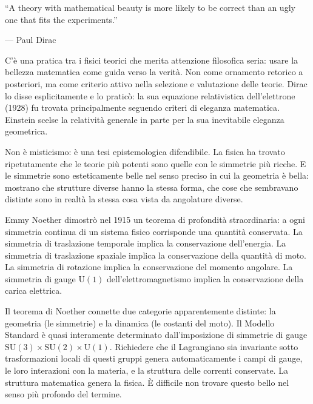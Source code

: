 \documentclass[12pt,a4paper,openany]{book}
\newcommand{\sezione}[1]{\vspace{1.2em}{\large\bfseries #1}\vspace{0.5em}\par}
\begin{document}
\epigraph{``A theory with mathematical beauty is more likely to be correct than an ugly one that fits the experiments.''}{--- Paul Dirac}

\sezione{La bellezza come guida}

C'è una pratica tra i fisici teorici che merita attenzione filosofica seria: usare la bellezza matematica come guida verso la verità. Non come ornamento retorico a posteriori, ma come criterio attivo nella selezione e valutazione delle teorie. Dirac lo disse esplicitamente e lo praticò: la sua equazione relativistica dell'elettrone (1928) fu trovata principalmente seguendo criteri di eleganza matematica. Einstein scelse la relatività generale in parte per la sua inevitabile eleganza geometrica.

Non è misticismo: è una tesi epistemologica difendibile. La fisica ha trovato ripetutamente che le teorie più potenti sono quelle con le simmetrie più ricche. E le simmetrie sono esteticamente belle nel senso preciso in cui la geometria è bella: mostrano che strutture diverse hanno la stessa forma, che cose che sembravano distinte sono in realtà la stessa cosa vista da angolature diverse.

\sezione{Il teorema di Noether}

Emmy Noether dimostrò nel 1915 un teorema di profondità straordinaria: a ogni simmetria continua di un sistema fisico corrisponde una quantità conservata. La simmetria di traslazione temporale implica la conservazione dell'energia. La simmetria di traslazione spaziale implica la conservazione della quantità di moto. La simmetria di rotazione implica la conservazione del momento angolare. La simmetria di gauge $\mathrm{U}(1)$ dell'elettromagnetismo implica la conservazione della carica elettrica.

Il teorema di Noether connette due categorie apparentemente distinte: la geometria (le simmetrie) e la dinamica (le costanti del moto). Il Modello Standard è quasi interamente determinato dall'imposizione di simmetrie di gauge $\mathrm{SU}(3) \times \mathrm{SU}(2) \times \mathrm{U}(1)$. Richiedere che il Lagrangiano sia invariante sotto trasformazioni locali di questi gruppi genera automaticamente i campi di gauge, le loro interazioni con la materia, e la struttura delle correnti conservate. La struttura matematica genera la fisica. È difficile non trovare questo bello nel senso più profondo del termine.

\sezione{Emmy Noether: la matematica più importante del Novecento}
\end{document}
